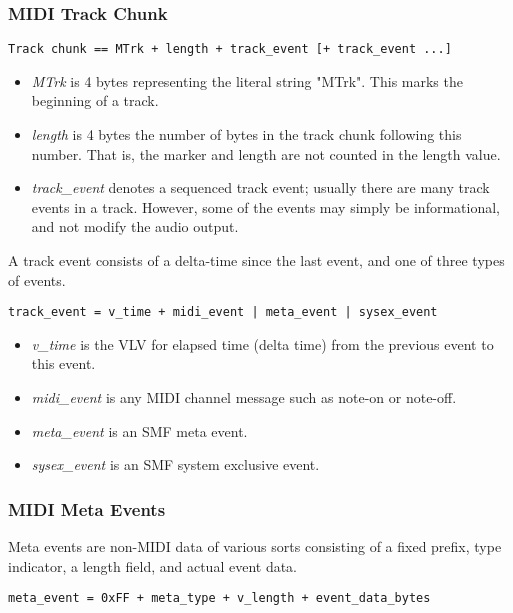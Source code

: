 \subsubsection{MIDI Track Chunk}
\label{subsubsec:midi_track_chunk}

   \texttt{Track chunk == MTrk + length + track\_event [+ track\_event ...]}

   \begin{itemize}
      \item \textsl{MTrk} is 4 bytes representing the literal string "MTrk".
         This marks the beginning of a track.
      \item \textsl{length} is 4 bytes the number of bytes in the track
         chunk following this number.  That is, the marker and length are
         not counted in the length value.
      \item \textsl{track\_event} denotes a sequenced track event; usually
         there are many track events in a  track.  However, some of the
         events may simply be informational, and not modify the audio
         output.
   \end{itemize}

   A track event consists of a delta-time since the last event, and one of
   three types of events.
 
   \texttt{track\_event = v\_time + midi\_event | meta\_event | sysex\_event}
 
   \begin{itemize}
      \item \textsl{v\_time} is the VLV for elapsed time
         (delta time) from the previous event to this event.
      \item \textsl{midi\_event} is any MIDI channel message such as note-on
         or note-off.
      \item \textsl{meta\_event} is an SMF meta event.
      \item \textsl{sysex\_event} is an SMF system exclusive event.
   \end{itemize}

\subsubsection{MIDI Meta Events}
\label{subsubsec:midi_meta_events}

   Meta events are non-MIDI data of various sorts consisting of a fixed prefix,
   type indicator, a length field, and actual event data.
 
   \texttt{meta\_event = 0xFF + meta\_type + v\_length + event\_data\_bytes}

